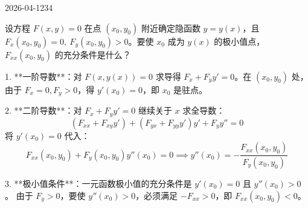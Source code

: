 \begin{mistake}{2026-04-12}{34}

\begin{problemcontent}
设方程 \( F(x,y)=0 \) 在点 \( (x_0,y_0) \) 附近确定隐函数 \( y=y(x) \)，且 \( F_x(x_0,y_0)=0,\ F_y(x_0,y_0)>0 \)。要使 \( x_0 \) 成为 \( y(x) \) 的极小值点，\( F_{xx}(x_0,y_0) \) 的充分条件是什么？
\end{problemcontent}

\begin{solutioncontent}
1. **一阶导数**：对 \( F(x,y(x))=0 \) 求导得 \( F_x + F_y y' = 0 \)。在 \( (x_0,y_0) \) 处，由于 \( F_x=0, F_y>0 \)，得 \( y'(x_0) = 0 \)，即 \( x_0 \) 是驻点。

2. **二阶导数**：对 \( F_x + F_y y' = 0 \) 继续关于 \( x \) 求全导数：
\[ (F_{xx} + F_{xy}y') + (F_{yx} + F_{yy}y')y' + F_y y'' = 0 \]
将 \( y'(x_0)=0 \) 代入：
\[ F_{xx}(x_0,y_0) + F_y(x_0,y_0)y''(x_0) = 0 \implies y''(x_0) = -\frac{F_{xx}(x_0,y_0)}{F_y(x_0,y_0)} \]

3. **极小值条件**：一元函数极小值的充分条件是 \( y'(x_0)=0 \) 且 \( y''(x_0)>0 \)。
由于 \( F_y > 0 \)，要使 \( y''(x_0) > 0 \)，必须满足 \( -F_{xx} > 0 \)，即 \( F_{xx}(x_0,y_0) < 0 \)。
\end{solutioncontent}


\end{mistake}
